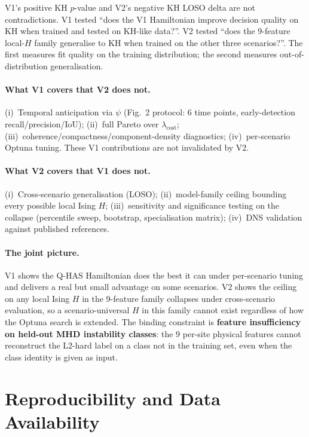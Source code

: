 \documentclass[12pt, a4paper, oneside]{report}
\begin{document}
V1's positive KH $p$-value and V2's negative KH LOSO delta are not contradictions. V1 tested ``does the V1 Hamiltonian improve decision quality on KH when trained and tested on KH-like data?''. V2 tested ``does the 9-feature local-$H$ family generalise to KH when trained on the other three scenarios?''. The first measures fit quality on the training distribution; the second measures out-of-distribution generalisation.

\paragraph{What V1 covers that V2 does not.}
(i)~Temporal anticipation via $\psi$ (Fig.~2 protocol: 6 time points, early-detection recall/precision/IoU); (ii)~full Pareto over $\lambda_\text{cost}$; (iii)~coherence/compactness/component-density diagnostics; (iv)~per-scenario Optuna tuning. These V1 contributions are not invalidated by V2.

\paragraph{What V2 covers that V1 does not.}
(i)~Cross-scenario generalisation (LOSO); (ii)~model-family ceiling bounding every possible local Ising $H$; (iii)~sensitivity and significance testing on the collapse (percentile sweep, bootstrap, specialisation matrix); (iv)~DNS validation against published references.

\paragraph{The joint picture.}
V1 shows the Q-HAS Hamiltonian does the best it can under per-scenario tuning and delivers a real but small advantage on some scenarios. V2 shows the ceiling on any local Ising $H$ in the 9-feature family collapses under cross-scenario evaluation, so a scenario-universal $H$ in this family cannot exist regardless of how the Optuna search is extended. The binding constraint is \textbf{feature insufficiency on held-out MHD instability classes}: the 9 per-site physical features cannot reconstruct the L2-hard label on a class not in the training set, even when the class identity is given as input.

\section{Reproducibility and Data Availability}
\label{sec:reproducibility}
\end{document}
